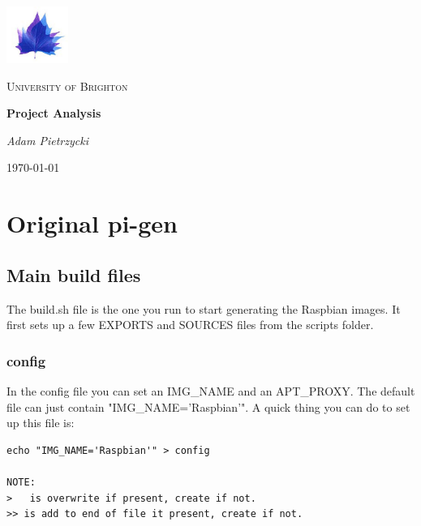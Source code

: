 \documentclass[12pt,a4paper]{report}
\begin{document}
\sloppy
\begin{titlepage}
	\centering
	\includegraphics[width=0.15\textwidth]{Brighton-University-logo.png}\par
	{\scshape\LARGE University of Brighton\par}
	\vspace{1cm}
	{\scshape\Large \par}
	\vspace{1.5cm}
	{\huge\bfseries Project Analysis\par}
	\vspace{2cm}
	{\Large\itshape Adam Pietrzycki\par}
	\vfill
	\par
	\textsc{}
	\vfill
	{\large \today\par}
\end{titlepage}

\begin{abstract}
In this document I will be keeping a log of my approach and analysis of this project, note that not everything in this will be of any use.     
\end{abstract}

\pagebreak
\tableofcontents
\pagebreak

\chapter{Original pi-gen}
\section{Main build files}
The build.sh file is the one you run to start generating the Raspbian images. It first sets up a few EXPORTS and SOURCES files from the scripts folder.
\subsection{config}
In the config file you can set an IMG\_NAME and an APT\_PROXY. The default file can just contain "IMG\_NAME='Raspbian'". A quick thing you can do to set up this file is: 
\begin{lstlisting}[frame=single]
echo "IMG_NAME='Raspbian'" > config

NOTE:
>   is overwrite if present, create if not.
>> is add to end of file it present, create if not.
\end{lstlisting}
\end{document}
